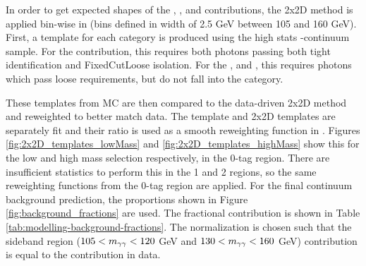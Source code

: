 In order to get expected shapes of the \yy, \yj, \jy and \jj contributions, the 2x2D method is applied bin-wise in \myy (bins defined in width of 2.5 GeV between 105 and 160 GeV). First, a template for each category is produced using the high stats \yy-continuum sample. For the \yy contribution, this requires both photons passing both tight identification and FixedCutLoose isolation. For the \yj, \jy and \jj, this requires photons which pass loose requirements, but do not fall into the \yy category.

These templates from \gls{MC} are then compared to the data-driven 2x2D method and reweighted to better match data. The template and 2x2D templates are separately fit and their ratio is used as a smooth reweighting function in \myy. Figures \ref{fig:2x2D_templates_lowMass} and \ref{fig:2x2D_templates_highMass} show this for the low and high mass selection respectively, in the 0-tag region. There are insufficient statistics to perform this in the 1 and 2 \btag regions, so the same reweighting functions from the 0-tag region are applied. For the final continuum \yy background prediction, the proportions shown in Figure \ref{fig:background_fractions} are used. The fractional contribution is shown in Table \ref{tab:modelling-background-fractions}. The normalization is chosen such that the sideband region ($105 < m_{\gamma\gamma} < 120$ GeV and $130 < m_{\gamma\gamma} <160$ GeV) contribution is equal to the contribution in data.

